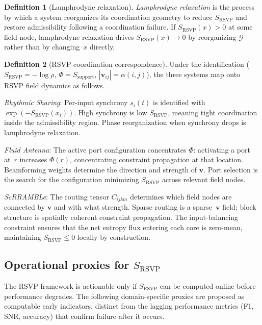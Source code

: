 \documentclass[11pt, a4paper]{article}
\theoremstyle{definition}
\newtheorem{definition}{Definition}
\theoremstyle{remark}
\begin{document}
\begin{definition}[Lamphrodyne relaxation]
\textit{Lamphrodyne relaxation} is the process by which a system reorganizes
its coordination geometry to reduce $S_{\mathrm{RSVP}}$ and restore
admissibility following a coordination failure. If $S_{\mathrm{RSVP}}(x) > 0$
at some field node, lamphrodyne relaxation drives $S_{\mathrm{RSVP}}(x)
\to 0$ by reorganizing $\mathcal{G}$ rather than by changing~$x$ directly.
\end{definition}

\begin{definition}[RSVP-coordination correspondence]
Under the identification ($S_{\mathrm{RSVP}} = -\log\rho$, $\Phi = S_{\mathrm{support}}$,
$|\mathbf{v}_{ij}| = \alpha(i,j)$), the three systems map onto RSVP field
dynamics as follows.

\textit{Rhythmic Sharing}: Per-input synchrony $s_i(t)$ is identified with
$\exp(-S_{\mathrm{RSVP}}(x_i))$. High synchrony is low $S_{\mathrm{RSVP}}$,
meaning tight coordination inside the admissibility region. Phase
reorganization when synchrony drops is lamphrodyne relaxation.

\textit{Fluid Antenna}: The active port configuration concentrates $\Phi$:
activating a port at~$r$ increases $\Phi(r)$, concentrating constraint
propagation at that location. Beamforming weights determine the direction
and strength of $\mathbf{v}$. Port selection is the search for the
configuration minimizing $S_{\mathrm{RSVP}}$ across relevant field nodes.

\textit{ScRRAMBLe}: The routing tensor $C_{ijkm}$ determines which field
nodes are connected by $\mathbf{v}$ and with what strength. Sparse routing
is a sparse~$\mathbf{v}$ field; block structure is spatially coherent
constraint propagation. The input-balancing constraint ensures that the
net entropy flux entering each core is zero-mean, maintaining $S_{\mathrm{RSVP}}
\leq 0$ locally by construction.
\end{definition}

\subsection*{Operational proxies for $S_{\mathrm{RSVP}}$}

The RSVP framework is actionable only if $S_{\mathrm{RSVP}}$ can be computed
online before performance degrades. The following domain-specific proxies
are proposed as computable early indicators, distinct from the lagging
performance metrics (F1, SNR, accuracy) that confirm failure after it occurs.
\end{document}

